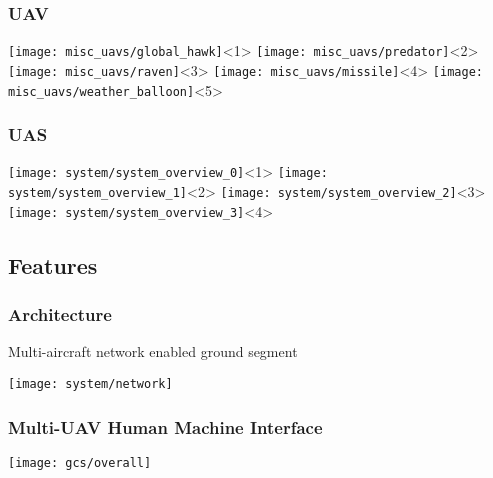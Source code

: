 \begin{frame}
  \frametitle{UAV}

  \begin{center}
    \texttt{[image: misc\_uavs/global\_hawk]}<1>
    \texttt{[image: misc\_uavs/predator]}<2>
    \texttt{[image: misc\_uavs/raven]}<3>
    \texttt{[image: misc\_uavs/missile]}<4>
    \texttt{[image: misc\_uavs/weather\_balloon]}<5>
  \end{center}
\end{frame}




\begin{frame}
  \frametitle{UAS}

  \begin{center}
    \texttt{[image: system/system\_overview\_0]}<1>
    \texttt{[image: system/system\_overview\_1]}<2>
    \texttt{[image: system/system\_overview\_2]}<3>
    \texttt{[image: system/system\_overview\_3]}<4>
  \end{center}
\end{frame}

%
%
\subsection{Features}



%
\begin{frame}
\frametitle{Architecture}
\begin{center}
Multi-aircraft network enabled ground segment
\end{center}
\begin{center}
\texttt{[image: system/network]}
\end{center}
\end{frame}




%
\begin{frame}
  \frametitle{Multi-UAV Human Machine Interface}

  \begin{center}
    \texttt{[image: gcs/overall]}
  \end{center}
\end{frame}


